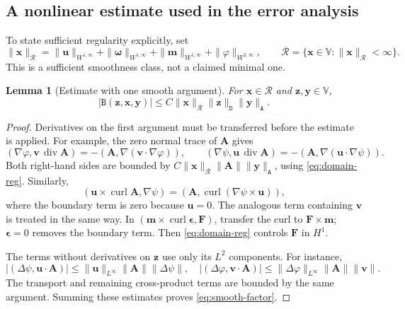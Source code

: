 \documentclass[11pt,a4paper]{article}
\newcommand{\bs}{\boldsymbol}
\DeclareMathOperator{\curl}{curl}
\DeclareMathOperator{\ddiv}{div}
\newcommand{\Div}{\ddiv}
\newcommand{\V}{\mathbb V}
\newcommand{\DD}{\mathtt D}
\newcommand{\Aform}{\mathtt A}
\newcommand{\BB}{\mathtt B}
\newtheorem{lemma}[lemma]{Lemma}
\theoremstyle{definition}
\numberwithin{equation}{section}
\begin{document}
\subsection{A nonlinear estimate used in the error analysis}
To state sufficient regularity explicitly, set
\begin{equation}\label{eq:regularity-norm}
 \|\bs x\|_{\mathcal R}=
 \|\bs u\|_{W^{1,\infty}}+\|\bs\omega\|_{W^{1,\infty}}
 +\|\bs m\|_{W^{1,\infty}}+\|\varphi\|_{W^{2,\infty}},
 \qquad \mathcal R=\{\bs x\in\V:\|\bs x\|_{\mathcal R}<\infty\}.
\end{equation}
This is a sufficient smoothness class, not a claimed minimal one.
\begin{lemma}[Estimate with one smooth argument]\label{lem:smooth-factor}
For $\bs x\in\mathcal R$ and $\bs z,\bs y\in\V$,
\begin{equation}\label{eq:smooth-factor}
 |\BB(\bs z,\bs x,\bs y)|\le C\|\bs x\|_{\mathcal R}\|\bs z\|_{\DD}\|\bs y\|_{\Aform}.
\end{equation}
\end{lemma}
\begin{proof}
Derivatives on the first argument must be transferred before the estimate is applied. For example, the zero normal trace of $\bs A$ gives
\[
 (\nabla\varphi,\bs v\,\Div\bs A)
 =-(\bs A,\nabla(\bs v\cdot\nabla\varphi)),
 \qquad
 (\nabla\psi,\bs u\,\Div\bs A)
 =-(\bs A,\nabla(\bs u\cdot\nabla\psi)).
\]
Both right-hand sides are bounded by
$C\|\bs x\|_{\mathcal R}\|\bs A\|\|\bs y\|_{\Aform}$, using \eqref{eq:domain-reg}. Similarly,
\[
 (\bs u\times\curl\bs A,\nabla\psi)
 =(\bs A,\curl(\nabla\psi\times\bs u)),
\]
where the boundary term is zero because $\bs u=0$. The analogous term containing $\bs v$ is treated in the same way. In $(\bs m\times\curl\bs\epsilon,\bs F)$, transfer the curl to $\bs F\times\bs m$; $\bs\epsilon=0$ removes the boundary term. Then \eqref{eq:domain-reg} controls $\bs F$ in $H^1$.

The terms without derivatives on $\bs z$ use only its $L^2$ components. For instance,
\[
 |(\Delta\psi,\bs u\cdot\bs A)|
 \le\|\bs u\|_{L^\infty}\|\bs A\|\|\Delta\psi\|,
 \quad
 |(\Delta\varphi,\bs v\cdot\bs A)|
 \le\|\Delta\varphi\|_{L^\infty}\|\bs A\|\|\bs v\|.
\]
The transport and remaining cross-product terms are bounded by the same argument. Summing these estimates proves \eqref{eq:smooth-factor}.
\end{proof}
\end{document}
